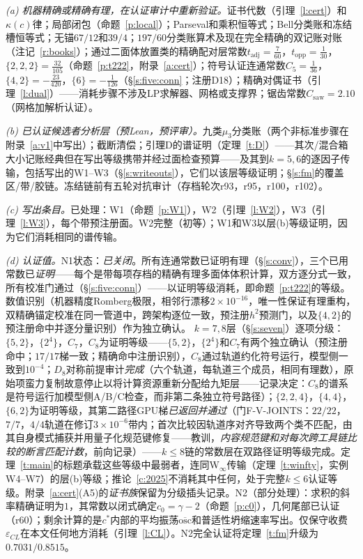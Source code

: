 \documentclass[11pt]{article}
\numberwithin{equation}{section}
\theoremstyle{definition}
\theoremstyle{remark}
\begin{document}
\emph{(a) 机器精确或精确有理，在认证审计中重新验证。}证书代数（引理~\ref{l:cert}）和$\kappa(c)$律；局部闭包（命题~\ref{p:local}）；Parseval和乘积恒等式；Bell分类账和冻结槽恒等式；无锚$67/12$和$39/4$；$197/60$分类账算术及现在完全精确的双记账对账（注记~\ref{r:books}）；通过二面体放置类的精确配对层常数$t_{\mathrm{adj}}=\tfrac7{60}$，$t_{\mathrm{opp}}=\tfrac1{30}$，$\{2,2,2\}=\tfrac{32}{105}$（命题~\ref{p:t222}，附录~\ref{a:cert}）；符号认证连通常数$C_5=\tfrac1{36}$，$\{4,2\}=-\tfrac{23}{420}$，$\{6\}=-\tfrac1{126}$（\S\ref{s:five:conn}；注册D18）；精确对偶证书（引理~\ref{l:dual}）——消耗步骤不涉及LP求解器、网格或支撑界；锯齿常数$C_{\mathrm{saw}}=2.10$（网格加解析认证）。

\emph{(b) 已认证候选者分析层（预Lean，预评审）。}九类$\mu_3$分类账（两个非标准步骤在附录~\ref{a:v1}中写出）；截断清偿；引理D的谱证明（定理~\ref{t:D}）——其次/混合箱大小记账经典但在写出等级携带并经过面检查预算——及其到$k=5,6$的逐因子传输，包括写出的W1--W3（\S\ref{s:writeouts}），它们以该层等级证明；\S\ref{s:fm}的覆盖区/带/胶链。冻结链前有五轮对抗审计（存档轮次r93，r95，r100，r102）。

\emph{(c) 写出条目。}已处理：W1（命题~\ref{p:W1}），W2（引理~\ref{l:W2}），W3（引理~\ref{l:W3}），每个带预注册面。W2完整（初等）；W1和W3以层(b)等级证明，因为它们消耗相同的谱传输。

\emph{(d) 认证值。}N1状态：\emph{已关闭}。所有连通常数已证明有理（\S\ref{s:conv}），三个已用常数已\emph{证明}——每个是带每项存档的精确有理多面体体积计算，双方逐分式一致，所有校准门通过（\S\ref{s:five:conn}）——以证明等级消耗，即命题~\ref{p:t222}的等级。数值识别（机器精度Romberg极限，相邻行漂移$2\times10^{-16}$，唯一性保证有理重构，双精确锚定校准在同一管道中，跨架构逐位一致，预注册$h^{2}$预测门，以及$\{4,2\}$的预注册命中并逐分量识别）作为独立确认。
$k=7,8$层（\S\ref{s:seven}）逐项分级：$\{5,2\}$，$\{2^4\}$，$C_7$，$C_8$为证明等级——$\{5,2\}$，$\{2^4\}$和$C_7$有两个独立确认（预注册命中；$17/17$梯一致；精确命中注册识别），$C_8$通过轨道约化符号运行，模型侧一致到$10^{-4}$；$D_8$对称前提审计\emph{完成}（六个轨道，每轨道三个成员，相同有理数），原始项蛮力复制故意停止以将计算资源重新分配给九矩层——记录决定：$C_8$的谱系是符号运行加模型侧A/B/C检查，而非第二条独立符号路径）；$\{2,2,4\}$，$\{4,4\}$，$\{6,2\}$为证明等级，其第二路径GPU梯\emph{已返回并通过}（门F-V-JOINTS：$22/22$，$7/7$，$4/4$轨道在修订$3\times10^{-6}$带内；首次比较因轨道序对齐导致两个类不匹配，由其自身模式捕获并用量子化规范键修复——教训，\emph{内容规范键和对每次跨工具链比较的断言匹配计数}，前向记录）——$k\le8$链的常数层在双路径证明等级完成。定理~\ref{t:main}的标题承载这些等级中最弱者，连同W$_\infty$传输（定理~\ref{t:winfty}，实例W4--W7）的层(b)等级；推论~\ref{c:2025}不消耗其中任何，处于完整$k\le6$认证等级。附录~\ref{a:cert}(A5)的\emph{证书族}保留为分级插头记录。N2（部分处理）：求积的斜率精确证明为$1$，其常数以闭式确定$c_0=\gamma-2$（命题~\ref{p:c0}），几何尾部已认证（r60）；剩余计算的是$c^{*}$内部的平均振荡$\overline{\mathrm{osc}}$和普适性坍缩速率写出。仅保守收费$\varepsilon_{CL}$在本文任何地方消耗（引理~\ref{l:CL}）。N2完全认证将定理~\ref{t:fm}升级为$0.7031/0.8515$。
\end{document}
